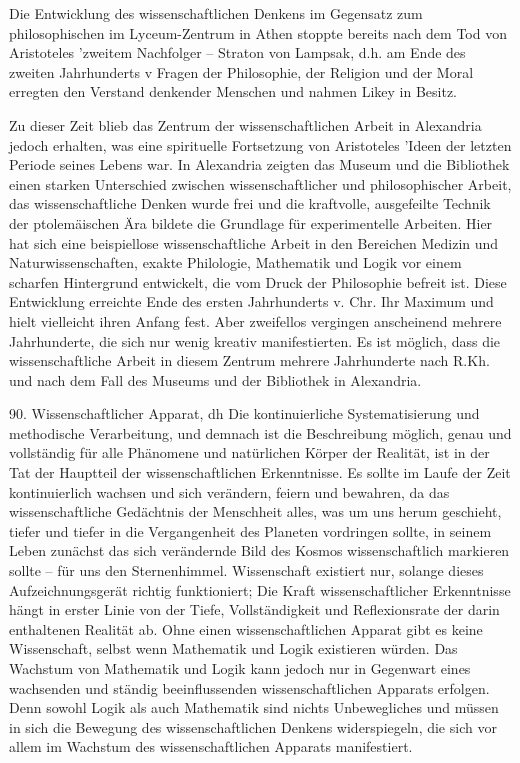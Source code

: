 \documentclass[11pt,a4paper]{book}
\begin{document}
Die Entwicklung des wissenschaftlichen Denkens im Gegensatz zum philosophischen im Lyceum-Zentrum in Athen stoppte bereits nach dem Tod von Aristoteles 'zweitem Nachfolger -- Straton von Lampsak, d.h. am Ende des zweiten Jahrhunderts v Fragen der Philosophie, der Religion und der Moral erregten den Verstand denkender Menschen und nahmen Likey in Besitz.



Zu dieser Zeit blieb das Zentrum der wissenschaftlichen Arbeit in Alexandria jedoch erhalten, was eine spirituelle Fortsetzung von Aristoteles 'Ideen der letzten Periode seines Lebens war. In Alexandria zeigten das Museum und die Bibliothek einen starken Unterschied zwischen wissenschaftlicher und philosophischer Arbeit, das wissenschaftliche Denken wurde frei und die kraftvolle, ausgefeilte Technik der ptolemäischen Ära bildete die Grundlage für experimentelle Arbeiten. Hier hat sich eine beispiellose wissenschaftliche Arbeit in den Bereichen Medizin und Naturwissenschaften, exakte Philologie, Mathematik und Logik vor einem scharfen Hintergrund entwickelt, die vom Druck der Philosophie befreit ist. Diese Entwicklung erreichte Ende des ersten Jahrhunderts v. Chr. Ihr Maximum und hielt vielleicht ihren Anfang fest. Aber zweifellos vergingen anscheinend mehrere Jahrhunderte, die sich nur wenig kreativ manifestierten. Es ist möglich, dass die wissenschaftliche Arbeit in diesem Zentrum mehrere Jahrhunderte nach R.Kh. und nach dem Fall des Museums und der Bibliothek in Alexandria.



90. Wissenschaftlicher Apparat, dh Die kontinuierliche Systematisierung und methodische Verarbeitung, und demnach ist die Beschreibung möglich, genau und vollständig für alle Phänomene und natürlichen Körper der Realität, ist in der Tat der Hauptteil der wissenschaftlichen Erkenntnisse. Es sollte im Laufe der Zeit kontinuierlich wachsen und sich verändern, feiern und bewahren, da das wissenschaftliche Gedächtnis der Menschheit alles, was um uns herum geschieht, tiefer und tiefer in die Vergangenheit des Planeten vordringen sollte, in seinem Leben zunächst das sich verändernde Bild des Kosmos wissenschaftlich markieren sollte -- für uns den Sternenhimmel. Wissenschaft existiert nur, solange dieses Aufzeichnungsgerät richtig funktioniert; Die Kraft wissenschaftlicher Erkenntnisse hängt in erster Linie von der Tiefe, Vollständigkeit und Reflexionsrate der darin enthaltenen Realität ab. Ohne einen wissenschaftlichen Apparat gibt es keine Wissenschaft, selbst wenn Mathematik und Logik existieren würden. Das Wachstum von Mathematik und Logik kann jedoch nur in Gegenwart eines wachsenden und ständig beeinflussenden wissenschaftlichen Apparats erfolgen. Denn sowohl Logik als auch Mathematik sind nichts Unbewegliches und müssen in sich die Bewegung des wissenschaftlichen Denkens widerspiegeln, die sich vor allem im Wachstum des wissenschaftlichen Apparats manifestiert.
\end{document}

